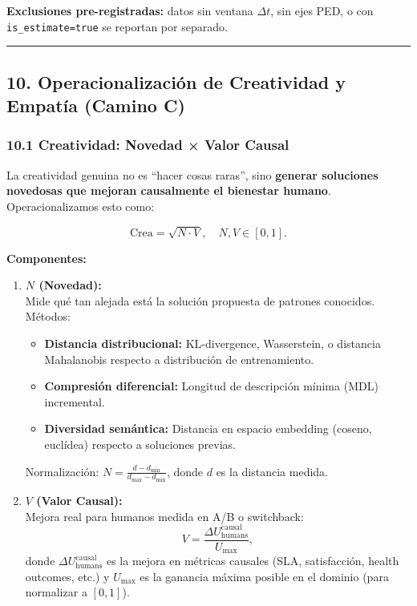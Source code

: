 \textbf{Exclusiones pre-registradas:} datos sin ventana \(\Delta t\),
sin ejes PED, o con \texttt{is\_estimate=true} se reportan por separado.

\begin{center}\rule{0.5\linewidth}{0.5pt}\end{center}

\subsection{10. Operacionalización de Creatividad y Empatía (Camino
C)}\label{operacionalizaciuxf3n-de-creatividad-y-empatuxeda-camino-c}

\subsubsection{10.1 Creatividad: Novedad × Valor
Causal}\label{creatividad-novedad-valor-causal}

La creatividad genuina no es ``hacer cosas raras'', sino \textbf{generar
soluciones novedosas que mejoran causalmente el bienestar humano}.
Operacionalizamos esto como:

\[
\text{Crea} = \sqrt{N \cdot V}, \quad N, V \in [0,1].
\]

\textbf{Componentes:}

\begin{enumerate}
\def\labelenumi{\arabic{enumi}.}
\item
  \textbf{\(N\) (Novedad):}\\
  Mide qué tan alejada está la solución propuesta de patrones conocidos.
  Métodos:

  \begin{itemize}
  \tightlist
  \item
    \textbf{Distancia distribucional:} KL-divergence, Wasserstein, o
    distancia Mahalanobis respecto a distribución de entrenamiento.
  \item
    \textbf{Compresión diferencial:} Longitud de descripción mínima
    (MDL) incremental.
  \item
    \textbf{Diversidad semántica:} Distancia en espacio embedding
    (coseno, euclídea) respecto a soluciones previas.
  \end{itemize}

  Normalización: \(N = \frac{d - d_{\min}}{d_{\max} - d_{\min}}\), donde
  \(d\) es la distancia medida.
\item
  \textbf{\(V\) (Valor Causal):}\\
  Mejora real para humanos medida en A/B o switchback: \[
  V = \frac{\Delta U_{\text{humans}}^{\text{causal}}}{U_{\text{max}}},
  \] donde \(\Delta U_{\text{humans}}^{\text{causal}}\) es la mejora en
  métricas causales (SLA, satisfacción, health outcomes, etc.) y
  \(U_{\text{max}}\) es la ganancia máxima posible en el dominio (para
  normalizar a \([0,1]\)).
\end{enumerate}

